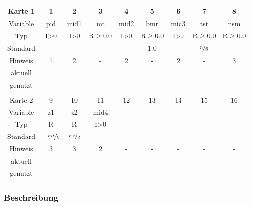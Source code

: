 \documentclass[11pt,titlepage,listof=totoc,bibliography=totoc,twoside]{scrreprt}
\begin{document}
{{\begin{table}[htbp]
\centering
\begin{tabularx}{\textwidth}{cCCCCCCCC}
\toprule
Karte 1	& 1		& 2		& 3		& 4		& 5		& 6		& 7			& 8		\\
\midrule
Variable& pid		& mid1		& mt		& mid2		& bmr		& mid3		& tst			& nsm		\\
Typ	& I>0		& I>0		& R$\ge$0.0	& I>0		& R$\ge$0.0	& I>0		& R$\ge$0.0		& R$\ge$0.0	\\
Standard& -		& -		& -		& -		& 1.0		& -		& $\nicefrac{5}{6}$	& -		\\
Hinweis	& 1		& 2		& -		& 2		& -		& 2		& -			& 3		\\
aktuell	& 	& 	& 	& 	& 	& 	& 	& 	\\
genutzt \\
\\
Karte 2	& 9		& 10		& 11		& 12		& 13		& 14		& 15			& 16		\\
\midrule
Variable& z1		& z2		& mid4		& -		& -		& -		& -			& -		\\
Typ	& R		& R		& I>0		& -		& -		& -		& -			& -		\\
Standard& $-\nicefrac{mt}{2}$	& $\nicefrac{mt}{2}$& -	& -		& -		& -		& -			& -		\\
Hinweis	& 3		& 3		& 2		& -		& -		& -		& -			& -		\\
aktuell	& 	& 	& 	& 	& 	& \multirow{2}{*}{-}	& 	& 	\\
genutzt \\
\bottomrule
\end{tabularx}
\end{table}

\subsubsection{Beschreibung}

}}
\end{document}
